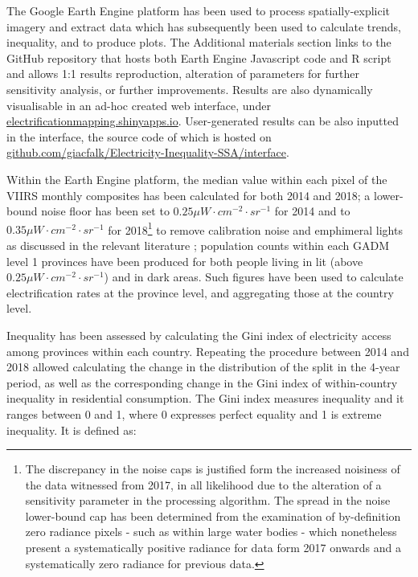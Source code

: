 \documentclass[preprint,12pt]{elsarticle}
\begin{document}
The Google Earth Engine platform \citep{gorelick2017google} has been used to process spatially-explicit imagery and extract data which has subsequently been used to calculate trends, inequality, and to produce plots. The Additional materials section links to the GitHub repository that hosts both Earth Engine Javascript code and R script and allows 1:1 results reproduction, alteration of parameters for further sensitivity analysis, or further improvements. Results are also dynamically visualisable in an ad-hoc created web interface, under \url{electrificationmapping.shinyapps.io}. User-generated results can be also inputted in the interface, the source code of which is hosted on \url{github.com/giacfalk/Electricity-Inequality-SSA/interface}.

Within the Earth Engine platform, the median value within each pixel of the VIIRS monthly composites has been calculated for both 2014 and 2018; a lower-bound noise floor has been set to $0.25 \mu W \cdot cm^{-2} \cdot sr^{-1}$ for 2014 and to $0.35 \mu W \cdot cm^{-2} \cdot sr^{-1}$ for 2018\footnote{The discrepancy in the noise caps is justified form the increased noisiness of the data witnessed from 2017, in all likelihood due to the alteration of a sensitivity parameter in the processing algorithm. The spread in the noise lower-bound cap has been determined from the examination of by-definition zero radiance pixels - such as within large water bodies - which nonetheless present a systematically positive radiance for data form 2017 onwards and a systematically zero radiance for previous data.} to remove calibration noise and emphimeral lights as discussed in the relevant literature \citep{roman_holidays_2015, levin_global_2017}; population counts within each GADM level 1 provinces have been produced for both people living in lit (above $0.25 \mu W \cdot cm^{-2} \cdot sr^{-1}$)  and in dark areas. Such figures have been used to calculate electrification rates at the province level, and aggregating those at the country level. 

Inequality has been assessed by calculating the Gini index of electricity access among provinces within each country. Repeating the procedure between 2014 and 2018 allowed calculating the change in the distribution of the split in the 4-year period, as well as the corresponding change in the Gini index of within-country inequality in residential consumption. The Gini index measures inequality and it ranges between 0 and 1, where 0 expresses perfect equality and 1 is extreme inequality. It is defined as:
\end{document}
